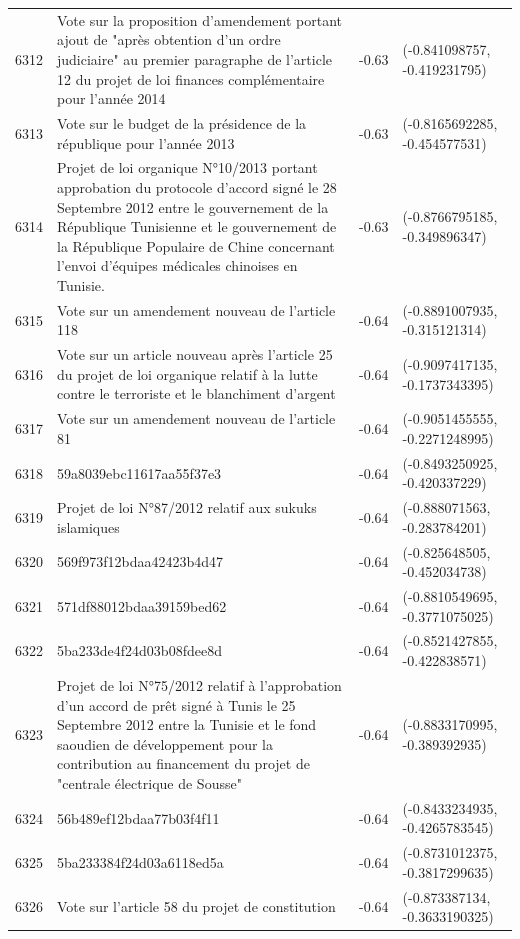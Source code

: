 \begin{table}[ht]
\begin{tabular}{rlrl}
  6312 & Vote sur la proposition d'amendement portant ajout de "après obtention d'un ordre judiciaire" au premier paragraphe de l'article 12 du projet de loi finances complémentaire pour l'année 2014 & -0.63 & (-0.841098757, -0.419231795) \\ 
  6313 & Vote sur le budget de la présidence de la république pour l'année 2013 & -0.63 & (-0.8165692285, -0.454577531) \\ 
  6314 & Projet de loi organique N°10/2013 portant approbation du protocole d'accord signé le 28 Septembre 2012 entre le gouvernement de la République Tunisienne et le gouvernement de la République Populaire de Chine concernant l'envoi d'équipes médicales chinoises en Tunisie. & -0.63 & (-0.8766795185, -0.349896347) \\ 
  6315 & Vote sur un amendement nouveau de l'article 118 & -0.64 & (-0.8891007935, -0.315121314) \\ 
  6316 & Vote sur un article nouveau après l'article 25 du projet de loi organique relatif à la lutte contre le terroriste et le blanchiment d'argent & -0.64 & (-0.9097417135, -0.1737343395) \\ 
  6317 & Vote sur un amendement nouveau de l'article 81 & -0.64 & (-0.9051455555, -0.2271248995) \\ 
  6318 & 59a8039ebc11617aa55f37e3 & -0.64 & (-0.8493250925, -0.420337229) \\ 
  6319 & Projet de loi N°87/2012 relatif aux sukuks islamiques & -0.64 & (-0.888071563, -0.283784201) \\ 
  6320 & 569f973f12bdaa42423b4d47 & -0.64 & (-0.825648505, -0.452034738) \\ 
  6321 & 571df88012bdaa39159bed62 & -0.64 & (-0.8810549695, -0.3771075025) \\ 
  6322 & 5ba233de4f24d03b08fdee8d & -0.64 & (-0.8521427855, -0.422838571) \\ 
  6323 & Projet de loi N°75/2012 relatif à l'approbation d'un accord de prêt signé à Tunis le 25 Septembre 2012 entre la Tunisie et le fond saoudien de développement pour la contribution au financement du projet de "centrale électrique de Sousse" & -0.64 & (-0.8833170995, -0.389392935) \\ 
  6324 & 56b489ef12bdaa77b03f4f11 & -0.64 & (-0.8433234935, -0.4265783545) \\ 
  6325 & 5ba233384f24d03a6118ed5a & -0.64 & (-0.8731012375, -0.3817299635) \\ 
  6326 & Vote sur l'article 58 du projet de constitution & -0.64 & (-0.873387134, -0.3633190325) \\ 

\end{tabular}
\end{table}

